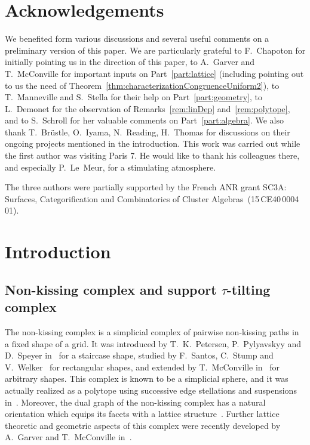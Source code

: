 \documentclass{memo-l}
\theoremstyle{definition}
\begin{document}
\maketitle

\tableofcontents



\section*{Acknowledgements}

We benefited form various discussions and several useful comments on a preliminary version of this paper.
We are particularly grateful to F.~Chapoton for initially pointing us in the direction of this paper, to A.~Garver and T.~McConville for important inputs on Part~\ref{part:lattice} (including pointing out to us the need of Theorem~\ref{thm:characterizationCongruenceUniform2}), to T.~Manneville and S.~Stella for their help on Part~\ref{part:geometry}, to L.~Demonet for the observation of Remarks~\ref{rem:linDep} and~\ref{rem:polytope}, and to S.~Schroll for her valuable comments on Part~\ref{part:algebra}.
We also thank T.~Br\"ustle, O.~Iyama, N.~Reading, H.~Thomas for discussions on their ongoing projects mentioned in the introduction.
This work was carried out while the first author was visiting Paris 7. He would like to thank his colleagues there, and especially \mbox{P.~Le Meur}, for a stimulating atmosphere.

The three authors were partially supported by the French ANR grant SC3A: Surfaces, Categorification and Combinatorics of Cluster Algebras~(15\,CE40\,0004\,01).


\mainmatter

\section*{Introduction}

\subsection*{Non-kissing complex and support $\tau$-tilting complex}

The non-kissing complex is a simplicial complex of pairwise non-kissing paths in a fixed shape of a grid.
It was introduced by T.~K.~Petersen, P.~Pylyavskyy and D.~Speyer in~\cite{PetersenPylyavskyySpeyer} for a staircase shape, studied by F.~Santos, C.~Stump and V.~Welker~\cite{SantosStumpWelker} for rectangular shapes, and extended by T.~McConville in~\cite{McConville} for arbitrary shapes.
This complex is known to be a simplicial sphere, and it was actually realized as a polytope using successive edge stellations and suspensions in~\cite[Sect.~4]{McConville}.
Moreover, the dual graph of the non-kissing complex has a natural orientation which equips its facets with a lattice structure~\cite[Thm. 1.1, Sect.~5--8]{McConville}.
Further lattice theoretic and geometric aspects of this complex were recently developed by A.~Garver and T.~McConville in~\cite{GarverMcConville-grid}.
\end{document}
